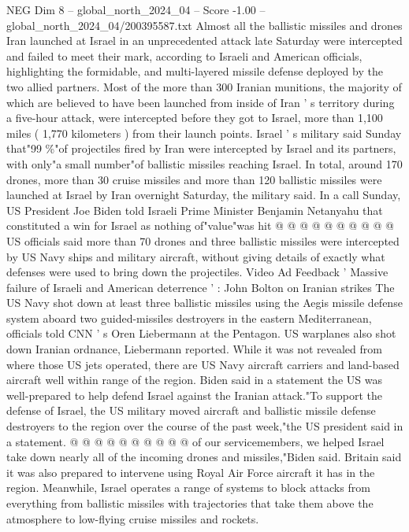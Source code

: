 \begin{textsample}{NEG Dim 8 – global\_north\_2024\_04 – Score -1.00 – global\_north\_2024\_04/200395587.txt}  \label{ex:f8_neg_401}
Almost all the ballistic missiles and drones Iran launched at Israel in an unprecedented attack late Saturday were intercepted and failed to meet their mark, according to Israeli and American officials, highlighting the formidable, and multi-layered missile defense deployed by the two allied partners.
Most of the more than 300 Iranian munitions, the majority of which are believed to have been launched from inside of Iran ' s territory during a five-hour attack, were intercepted before they got to Israel, more than 1,100 miles ( 1,770 kilometers ) from their launch points.
Israel ' s military said Sunday that"99 \%"of projectiles fired by Iran were intercepted by Israel and its partners, with only"a small number"of ballistic missiles reaching Israel.
In total, around 170 drones, more than 30 cruise missiles and more than 120 ballistic missiles were launched at Israel by Iran overnight Saturday, the military said.
In a call Sunday, US President Joe Biden told Israeli Prime Minister Benjamin Netanyahu that constituted a win for Israel as nothing of"value"was hit @ @ @ @ @ @ @ @ @ @ US officials said more than 70 drones and three ballistic missiles were intercepted by US Navy ships and military aircraft, without giving details of exactly what defenses were used to bring down the projectiles.
Video Ad Feedback ' Massive failure of Israeli and American deterrence ' : John Bolton on Iranian strikes The US Navy shot down at least three ballistic missiles using the Aegis missile defense system aboard two guided-missiles destroyers in the eastern Mediterranean, officials told CNN ' s Oren Liebermann at the Pentagon.
US warplanes also shot down Iranian ordnance, Liebermann reported.
While it was not revealed from where those US jets operated, there are US Navy aircraft carriers and land-based aircraft well within range of the region.
Biden said in a statement the US was well-prepared to help defend Israel against the Iranian attack."To support the defense of Israel, the US military moved aircraft and ballistic missile defense destroyers to the region over the course of the past week,"the US president said in a statement. @ @ @ @ @ @ @ @ @ @ of our servicemembers, we helped Israel take down nearly all of the incoming drones and missiles,"Biden said.
Britain said it was also prepared to intervene using Royal Air Force aircraft it has in the region.
Meanwhile, Israel operates a range of systems to block attacks from everything from ballistic missiles with trajectories that take them above the atmosphere to low-flying cruise missiles and rockets.

\end{textsample}
